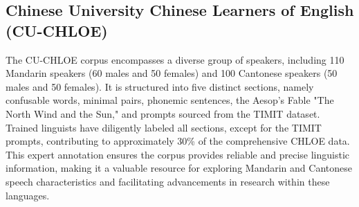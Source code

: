 

\subsection{Chinese University Chinese Learners of English (CU-CHLOE) \cite{CH-CHLOE}}
The CU-CHLOE corpus encompasses a diverse group of speakers, including 110 Mandarin speakers (60 males and 50 females) and 100 Cantonese speakers (50 males and 50 females). It is structured into five distinct sections, namely confusable words, minimal pairs, phonemic sentences, the Aesop's Fable "The North Wind and the Sun," and prompts sourced from the TIMIT dataset. Trained linguists have diligently labeled all sections, except for the TIMIT prompts, contributing to approximately 30\% of the comprehensive CHLOE data. This expert annotation ensures the corpus provides reliable and precise linguistic information, making it a valuable resource for exploring Mandarin and Cantonese speech characteristics and facilitating advancements in research within these languages.



